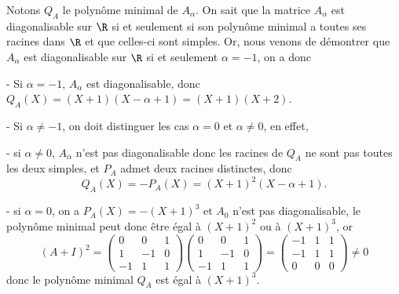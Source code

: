 {\begin{enumerate}
{ Notons $Q_A$ le polyn\^ome minimal de $A_\alpha$. On sait que la matrice $A_\alpha$ est diagonalisable sur $\R$ si et seulement si son polyn\^ome minimal a toutes ses racines dans $\R$ et que celles-ci sont simples. Or, nous venons de d\'emontrer que $A_\alpha$ est diagonalisable sur $\R$ si et seulement $\alpha=-1$, on a donc 

- Si $\alpha=-1$, $A_\alpha$ est diagonalisable, donc $Q_A(X)=(X+1)(X-\alpha+1)=(X+1)(X+2)$.

- Si $\alpha\neq -1$, on doit distinguer les cas $\alpha=0$ et $\alpha\neq0$, en effet, 

\indent - si $\alpha\neq 0$,  $A_\alpha$ n'est pas diagonalisable donc les racines de $Q_A$ ne sont pas toutes les deux simples, et $P_A$ admet deux racines distinctes, donc
$$Q_A(X)=-P_A(X)=(X+1)^2(X-\alpha+1).$$

\indent- si $\alpha=0$, on a $P_A(X)=-(X+1)^3$ et $A_0$ n'est pas diagonalisable, le polyn\^ome minimal peut donc \^etre \'egal \`a $(X+1)^2$ ou \`a $(X+1)^3$, or
$$(A+I)^2=\begin{pmatrix}0 & 0 & 1 \\  1&-1&0 \\ -1&1&1\end{pmatrix}\begin{pmatrix}0 & 0 & 1 \\  1&-1&0 \\ -1&1&1\end{pmatrix}=\begin{pmatrix}-1 & 1 & 1 \\  -1&1&1 \\ 0&0&0\end{pmatrix}\neq0$$
donc le polyn\^ome minimal $Q_A$ est \'egal \`a $(X+1)^3$.}
\end{enumerate}
}